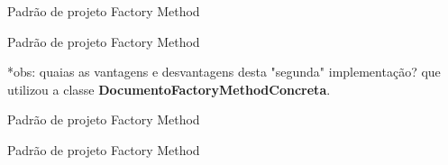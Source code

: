 \begin{frame}[t]{Padrão de projeto Factory Method}
	
	


\end{frame}




\begin{frame}[t]{Padrão de projeto Factory Method}
	
	

*obs: quaias as vantagens e desvantagens desta "segunda" implementação? que utilizou a classe \textbf{DocumentoFactoryMethodConcreta}.

\end{frame}



\begin{frame}[t]{Padrão de projeto Factory Method}
	
	
	
\end{frame}


\begin{frame}[t]{Padrão de projeto Factory Method}
	
	
	
\end{frame}





